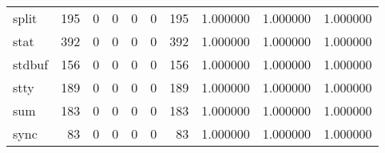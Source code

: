 \begin{tabular}{lrrrrrrrrr}
split     &                                   195 &                                                  0 &                                                  0 &                                                  0 &                                                  0 &                                                195 &                                           1.000000 &                               1.000000 &                             1.000000 \\
stat      &                                   392 &                                                  0 &                                                  0 &                                                  0 &                                                  0 &                                                392 &                                           1.000000 &                               1.000000 &                             1.000000 \\
stdbuf    &                                   156 &                                                  0 &                                                  0 &                                                  0 &                                                  0 &                                                156 &                                           1.000000 &                               1.000000 &                             1.000000 \\
stty      &                                   189 &                                                  0 &                                                  0 &                                                  0 &                                                  0 &                                                189 &                                           1.000000 &                               1.000000 &                             1.000000 \\
sum       &                                   183 &                                                  0 &                                                  0 &                                                  0 &                                                  0 &                                                183 &                                           1.000000 &                               1.000000 &                             1.000000 \\
sync      &                                    83 &                                                  0 &                                                  0 &                                                  0 &                                                  0 &                                                 83 &                                           1.000000 &                               1.000000 &                             1.000000 \\

\end{tabular}

